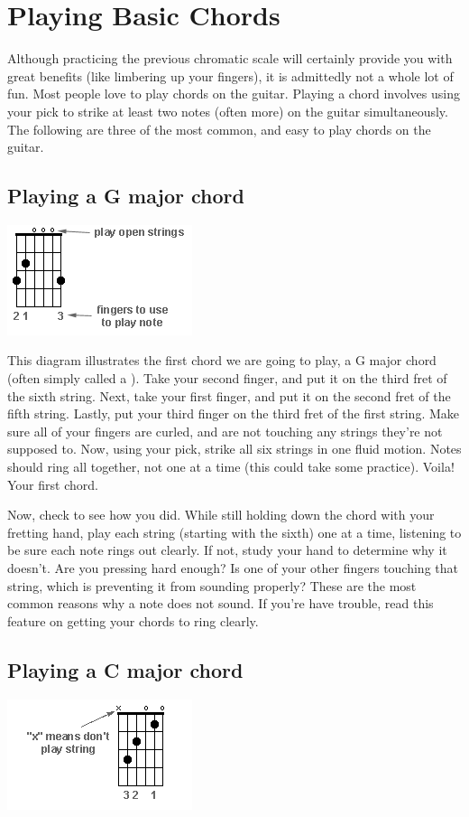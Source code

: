 \section{Playing Basic Chords}
Although practicing the previous chromatic scale will certainly provide you
with great benefits (like limbering up your fingers), it is admittedly not a
whole lot of fun. Most people love to play chords on the guitar. Playing a
chord involves using your pick to strike at least two notes (often more) on the
guitar simultaneously. The following are three of the most common, and easy to
play chords on the guitar. 

\subsection{Playing a G major chord}
\includegraphics{partone/opengmajor.png}

This diagram illustrates the first chord we are going to play, a G major chord
(often simply called a ). Take your second finger, and put it on the
third fret of the sixth string. Next, take your first finger, and put it on the
second fret of the fifth string. Lastly, put your third finger on the third
fret of the first string. Make sure all of your fingers are curled, and are not
touching any strings they're not supposed to. Now, using your pick, strike all
six strings in one fluid motion. Notes should ring all together, not one at a
time (this could take some practice). Voila! Your first chord.

Now, check to see how you did. While still holding down the chord with your
fretting hand, play each string (starting with the sixth) one at a time,
listening to be sure each note rings out clearly. If not, study your hand to
determine why it doesn't. Are you pressing hard enough? Is one of your other
fingers touching that string, which is preventing it from sounding properly?
These are the most common reasons why a note does not sound. If you're have
trouble, read this feature on getting your chords to ring clearly. 

\subsection{Playing a C major chord}
\includegraphics{partone/opencmajor.png}

